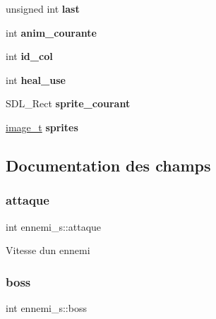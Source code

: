 \begin{DoxyCompactItemize}
\mbox{\label{structennemi__s_a57f7d31c834716fca33c2a6fc0ff837b}} 
unsigned int {\bfseries last}
\item 
\mbox{\label{structennemi__s_a9b4173b2494c8886cdc778f9cf7111e0}} 
int {\bfseries anim\+\_\+courante}
\item 
\mbox{\label{structennemi__s_a6ada16fb1da87e04d11b3104a8821a64}} 
int {\bfseries id\+\_\+col}
\item 
\mbox{\label{structennemi__s_a9783dbbbcc5cbf8cbe631efdedbcf9be}} 
int {\bfseries heal\+\_\+use}
\item 
\mbox{\label{structennemi__s_a4f3642055fd44402e243dfbd5eba7a33}} 
S\+D\+L\+\_\+\+Rect {\bfseries sprite\+\_\+courant}
\item 
\mbox{\label{structennemi__s_acca31c72d6e661bced1635a6b6a210c8}} 
\hyperlink{structimage__t}{image\+\_\+t} {\bfseries sprites}
\end{DoxyCompactItemize}


\subsection{Documentation des champs}
\mbox{\label{structennemi__s_a1b3d60dde3acf89c6ba6ae2c250109e2}} 
\subsubsection{\texorpdfstring{attaque}{attaque}}
{\footnotesize\ttfamily int ennemi\+\_\+s\+::attaque}

Vitesse d\textquotesingle{}un ennemi \mbox{\label{structennemi__s_a38a4d8c90aba3e83b1d13fbef1613e6a}} 
\subsubsection{\texorpdfstring{boss}{boss}}
{\footnotesize\ttfamily int ennemi\+\_\+s\+::boss}

